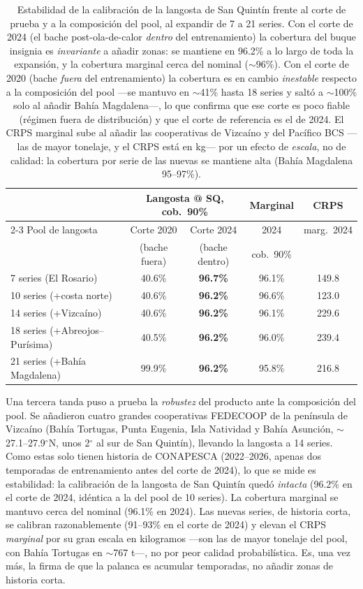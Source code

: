 \begin{table}[htbp]
\centering
\small
\begin{tabular}{p{4.6cm}cccc}
\toprule
 & \multicolumn{2}{c}{Langosta @ SQ, cob.\ 90\%} & Marginal & CRPS \\
\cmidrule(lr){2-3}
Pool de langosta & Corte 2020 & Corte 2024 & 2024 & marg.\ 2024 \\
 & (bache fuera) & (bache dentro) & cob.\ 90\% & \\
\midrule
7 series (El Rosario) & 40.6\% & \textbf{96.7\%} & 96.1\% & 149.8 \\
10 series (+costa norte) & 40.6\% & \textbf{96.2\%} & 96.6\% & 123.0 \\
14 series (+Vizcaíno) & 40.6\% & \textbf{96.2\%} & 96.1\% & 229.6 \\
18 series (+Abreojos--Purísima) & 40.5\% & \textbf{96.2\%} & 96.0\% & 239.4 \\
21 series (+Bahía Magdalena) & 99.9\% & \textbf{96.2\%} & 95.8\% & 216.8 \\
\bottomrule
\end{tabular}
\caption{Estabilidad de la calibración de la langosta de San Quintín frente al corte de prueba y a la composición del pool, al expandir de 7 a 21 series. Con el corte de 2024 (el bache post-ola-de-calor \emph{dentro} del entrenamiento) la cobertura del buque insignia es \emph{invariante} a añadir zonas: se mantiene en 96.2\% a lo largo de toda la expansión, y la cobertura marginal cerca del nominal ($\sim$96\%). Con el corte de 2020 (bache \emph{fuera} del entrenamiento) la cobertura es en cambio \emph{inestable} respecto a la composición del pool ---se mantuvo en $\sim$41\% hasta 18 series y saltó a $\sim$100\% solo al añadir Bahía Magdalena---, lo que confirma que ese corte es poco fiable (régimen fuera de distribución) y que el corte de referencia es el de 2024. El CRPS marginal sube al añadir las cooperativas de Vizcaíno y del Pacífico BCS ---las de mayor tonelaje, y el CRPS está en kg--- por un efecto de \emph{escala}, no de calidad: la cobertura por serie de las nuevas se mantiene alta (Bahía Magdalena 95--97\%).}
\label{tab:extension_moredata}
\end{table}

Una tercera tanda puso a prueba la \emph{robustez} del producto ante la composición del pool. Se añadieron cuatro grandes cooperativas FEDECOOP de la península de Vizcaíno (Bahía Tortugas, Punta Eugenia, Isla Natividad y Bahía Asunción, $\sim$27.1--27.9$^\circ$N, unos 2$^\circ$ al sur de San Quintín), llevando la langosta a 14 series. Como estas solo tienen historia de CONAPESCA (2022--2026, apenas dos temporadas de entrenamiento antes del corte de 2024), lo que se mide es estabilidad: la calibración de la langosta de San Quintín quedó \emph{intacta} (96.2\% en el corte de 2024, idéntica a la del pool de 10 series). La cobertura marginal se mantuvo cerca del nominal (96.1\% en 2024). Las nuevas series, de historia corta, se calibran razonablemente (91--93\% en el corte de 2024) y elevan el CRPS \emph{marginal} por su gran escala en kilogramos ---son las de mayor tonelaje del pool, con Bahía Tortugas en $\sim$767 t---, no por peor calidad probabilística. Es, una vez más, la firma de que la palanca es acumular temporadas, no añadir zonas de historia corta.

